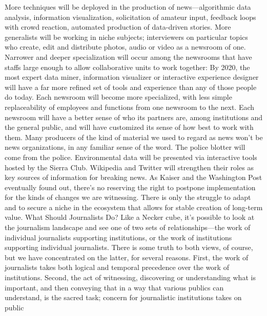 More techniques will be deployed in the production of news—algorithmic data
analysis, information visualization, solicitation of amateur input, feedback loops
with crowd reaction, automated production of data-driven stories. More generalists
will be working in niche subjects; interviewers on particular topics who create,
edit and distribute photos, audio or video as a newsroom of one. Narrower
and deeper specialization will occur among the newsrooms that have staffs large
enough to allow collaborative units to work together: By 2020, the most expert
data miner, information visualizer or interactive experience designer will have a
far more refined set of tools and experience than any of those people do today.
Each newsroom will become more specialized, with less simple replaceability of
employees and functions from one newsroom to the next. Each newsroom will
have a better sense of who its partners are, among institutions and the general
public, and will have customized its sense of how best to work with them. Many
producers of the kind of material we used to regard as news won’t be news organizations,
in any familiar sense of the word. The police blotter will come from
the police. Environmental data will be presented via interactive tools hosted by
the Sierra Club. Wikipedia and Twitter will strengthen their roles as key sources
of information for breaking news.
As Kaiser and the Washington Post eventually found out, there’s no reserving the
right to postpone implementation for the kinds of changes we are witnessing.
There is only the struggle to adapt and to secure a niche in the ecosystem that
allows for stable creation of long-term value.
What Should Journalists Do?
Like a Necker cube, it’s possible to look at the journalism landscape and see
one of two sets of relationships—the work of individual journalists supporting
institutions, or the work of institutions supporting individual journalists. There
is some truth to both views, of course, but we have concentrated on the latter,
for several reasons.
First, the work of journalists takes both logical and temporal precedence over the
work of institutions. Second, the act of witnessing, discovering or understanding
what is important, and then conveying that in a way that various publics can
understand, is the sacred task; concern for journalistic institutions takes on public

